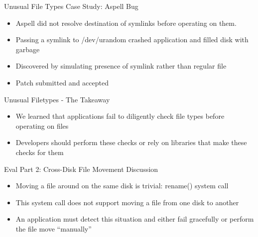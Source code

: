 \documentclass[pdf]{beamer}
\begin{document}
\begin{frame}{Unusual File Types Case Study: Aspell Bug}
  \begin{itemize}
    \item{Aspell did not resolve destination of symlinks before operating
      on them.}
    \item{Passing a symlink to /dev/urandom crashed application and filled
      disk with garbage}
    \item{Discovered by simulating presence of symlink rather than regular
      file}
    \item{Patch submitted and accepted}
  \end{itemize}
\end{frame}


\begin{frame}{Unusual Filetypes - The Takeaway}

  \begin{itemize}
    \item{We learned that applications fail to diligently check file types
        before operating on files}
    \item{Developers should perform these checks or rely on libraries that
        make these checks for them}
  \end{itemize}
\end{frame}


\begin{frame}{Eval Part 2: Cross-Disk File Movement Discussion}

  \begin{itemize}
    \item{Moving a file around on the same disk is trivial: rename() system
      call}
    \item{This system call does not support moving a file from one disk to
      another}
    \item{An application must detect this situation and either fail
      gracefully or perform the file move ``manually''}
  \end{itemize}
\end{frame}
\end{document}
